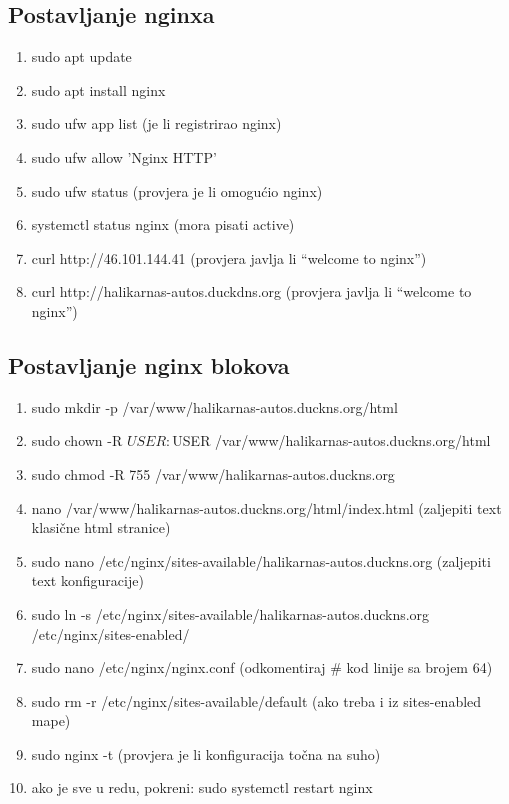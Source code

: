 \begin{flushleft}
	   \subsection{Postavljanje nginxa}
	   \begin{enumerate}
	        \item sudo apt update
	        \item sudo apt install nginx
	        \item sudo ufw app list (je li registrirao nginx)
	        \item sudo ufw allow 'Nginx HTTP'
	        \item sudo ufw status (provjera je li omogućio nginx)
	        \item systemctl status nginx (mora pisati active)
	        \item curl http://46.101.144.41 (provjera javlja li “welcome to nginx”)
	        \item curl http://halikarnas-autos.duckdns.org (provjera javlja li “welcome to nginx”)
	   \end{enumerate}
	   
	   \subsection{Postavljanje nginx blokova}
	   \begin{enumerate}
	        \item sudo mkdir -p /var/www/halikarnas-autos.duckns.org/html
	        \item sudo chown -R $USER:$USER /var/www/halikarnas-autos.duckns.org/html
	        \item sudo chmod -R 755 /var/www/halikarnas-autos.duckns.org
	        \item nano /var/www/halikarnas-autos.duckns.org/html/index.html (zaljepiti text klasične html stranice)
	        \item sudo nano /etc/nginx/sites-available/halikarnas-autos.duckns.org (zaljepiti text konfiguracije)
	        \item sudo ln -s /etc/nginx/sites-available/halikarnas-autos.duckns.org /etc/nginx/sites-enabled/
	        \item sudo nano /etc/nginx/nginx.conf (odkomentiraj \# kod linije sa brojem 64)
	        \item sudo rm -r /etc/nginx/sites-available/default (ako treba i iz sites-enabled mape)
	        \item sudo nginx -t (provjera je li konfiguracija točna na suho)
	        \item ako je sve u redu, pokreni: sudo systemctl restart nginx
	   \end{enumerate}


\end{flushleft}
